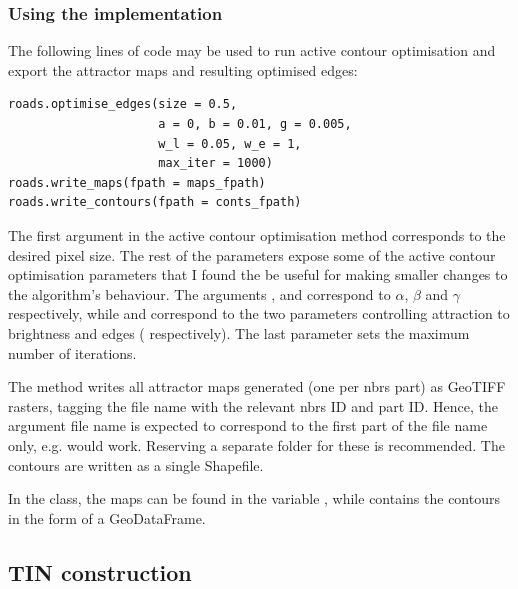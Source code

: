 \subsubsection{Using the implementation}

The following lines of code may be used to run active contour optimisation and export the attractor maps and resulting optimised edges:

\begin{verbatim}
roads.optimise_edges(size = 0.5,
                     a = 0, b = 0.01, g = 0.005,
                     w_l = 0.05, w_e = 1,
                     max_iter = 1000)
roads.write_maps(fpath = maps_fpath)
roads.write_contours(fpath = conts_fpath)
\end{verbatim}

The first argument  in the active contour optimisation method corresponds to the desired pixel size. The rest of the parameters expose some of the active contour optimisation parameters that I found the be useful for making smaller changes to the algorithm's behaviour. The arguments ,  and  correspond to $\alpha$, $\beta$ and $\gamma$ respectively, while  and  correspond to the two parameters controlling attraction to brightness and edges (  respectively). The last parameter sets the maximum number of iterations.

The  method writes all attractor maps generated (one per \ac{nbrs} part) as GeoTIFF rasters, tagging the file name with the relevant \ac{nbrs} ID and part ID. Hence, the argument file name is expected to correspond to the first part of the file name only, e.g.  would work. Reserving a separate folder for these is recommended. The contours are written as a single Shapefile.

In the class, the maps can be found in the variable , while  contains the contours in the form of a GeoDataFrame.

\subsection{TIN construction}
\label{sub:r_tinconstruction}

